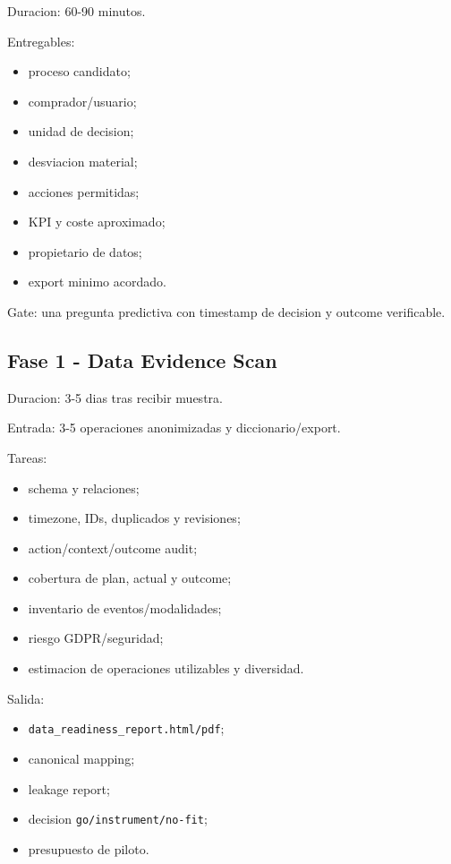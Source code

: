 \documentclass[
  spanish,
  10pt,
  a4paper,
]{article}
\providecommand{\tightlist}{%
  \setlength{\itemsep}{0pt}\setlength{\parskip}{0pt}}
\begin{document}
Duracion: 60-90 minutos.

Entregables:

\begin{itemize}
\tightlist
\item
  proceso candidato;
\item
  comprador/usuario;
\item
  unidad de decision;
\item
  desviacion material;
\item
  acciones permitidas;
\item
  KPI y coste aproximado;
\item
  propietario de datos;
\item
  export minimo acordado.
\end{itemize}

Gate: una pregunta predictiva con timestamp de decision y outcome
verificable.

\subsection{Fase 1 - Data Evidence
Scan}\label{fase-1---data-evidence-scan}

Duracion: 3-5 dias tras recibir muestra.

Entrada: 3-5 operaciones anonimizadas y diccionario/export.

Tareas:

\begin{itemize}
\tightlist
\item
  schema y relaciones;
\item
  timezone, IDs, duplicados y revisiones;
\item
  action/context/outcome audit;
\item
  cobertura de plan, actual y outcome;
\item
  inventario de eventos/modalidades;
\item
  riesgo GDPR/seguridad;
\item
  estimacion de operaciones utilizables y diversidad.
\end{itemize}

Salida:

\begin{itemize}
\tightlist
\item
  \texttt{data\_readiness\_report.html/pdf};
\item
  canonical mapping;
\item
  leakage report;
\item
  decision \texttt{go/instrument/no-fit};
\item
  presupuesto de piloto.
\end{itemize}
\end{document}

